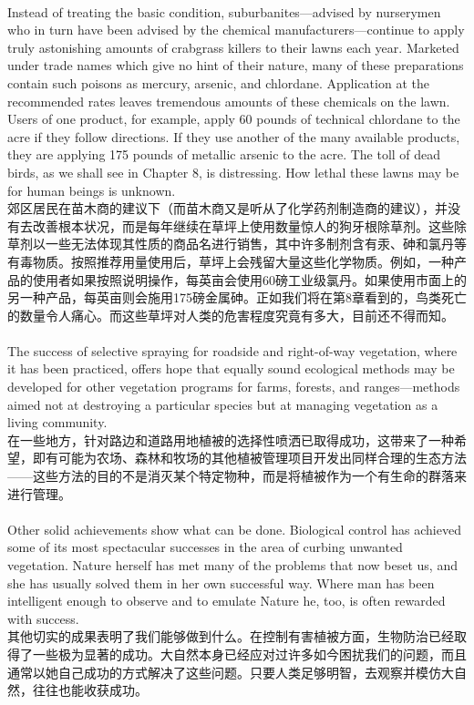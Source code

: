 \documentclass{article}
\begin{document}
\\
Instead of treating the basic condition, suburbanites—advised by nurserymen who in turn have been advised by the chemical manufacturers—continue to apply truly astonishing amounts of crabgrass killers to their lawns each year. Marketed under trade names which give no hint of their nature, many of these preparations contain such poisons as mercury, arsenic, and chlordane. Application at the recommended rates leaves tremendous amounts of these chemicals on the lawn. Users of one product, for example, apply 60 pounds of technical chlordane to the acre if they follow directions. If they use another of the many available products, they are applying 175 pounds of metallic arsenic to the acre. The toll of dead birds, as we shall see in Chapter 8, is distressing. How lethal these lawns may be for human beings is unknown.\\
郊区居民在苗木商的建议下（而苗木商又是听从了化学药剂制造商的建议），并没有去改善根本状况，而是每年继续在草坪上使用数量惊人的狗牙根除草剂。这些除草剂以一些无法体现其性质的商品名进行销售，其中许多制剂含有汞、砷和氯丹等有毒物质。按照推荐用量使用后，草坪上会残留大量这些化学物质。例如，一种产品的使用者如果按照说明操作，每英亩会使用60磅工业级氯丹。如果使用市面上的另一种产品，每英亩则会施用175磅金属砷。正如我们将在第8章看到的，鸟类死亡的数量令人痛心。而这些草坪对人类的危害程度究竟有多大，目前还不得而知。 \\

\\
The success of selective spraying for roadside and right-of-way vegetation, where it has been practiced, offers hope that equally sound ecological methods may be developed for other vegetation programs for farms, forests, and ranges—methods aimed not at destroying a particular species but at managing vegetation as a living community.\\
在一些地方，针对路边和道路用地植被的选择性喷洒已取得成功，这带来了一种希望，即有可能为农场、森林和牧场的其他植被管理项目开发出同样合理的生态方法——这些方法的目的不是消灭某个特定物种，而是将植被作为一个有生命的群落来进行管理。 \\

\\
Other solid achievements show what can be done. Biological control has achieved some of its most spectacular successes in the area of curbing unwanted vegetation. Nature herself has met many of the problems that now beset us, and she has usually solved them in her own successful way. Where man has been intelligent enough to observe and to emulate Nature he, too, is often rewarded with success.\\
其他切实的成果表明了我们能够做到什么。在控制有害植被方面，生物防治已经取得了一些极为显著的成功。大自然本身已经应对过许多如今困扰我们的问题，而且通常以她自己成功的方式解决了这些问题。只要人类足够明智，去观察并模仿大自然，往往也能收获成功。 \\
\end{document}
